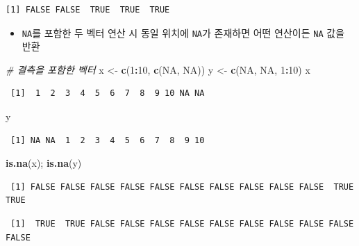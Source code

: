 \documentclass[
  11pt,
]{krantz}
\newenvironment{Shaded}{\begin{snugshade}}{\end{snugshade}}
\newcommand{\CommentTok}[1]{\textcolor[rgb]{0.37,0.37,0.37}{\textit{#1}}}
\newcommand{\DecValTok}[1]{\textcolor[rgb]{0.06,0.06,0.06}{#1}}
\newcommand{\KeywordTok}[1]{\textcolor[rgb]{0.27,0.27,0.27}{\textbf{#1}}}
\newcommand{\NormalTok}[1]{#1}
\newcommand{\OperatorTok}[1]{\textcolor[rgb]{0.43,0.43,0.43}{\textbf{#1}}}
\newcommand{\OtherTok}[1]{\textcolor[rgb]{0.37,0.37,0.37}{#1}}
\newcommand{\StringTok}[1]{\textcolor[rgb]{0.5,0.5,0.5}{#1}}
\providecommand{\tightlist}{%
  \setlength{\itemsep}{0pt}\setlength{\parskip}{0pt}}
\begin{document}
\begin{verbatim}
[1] FALSE FALSE  TRUE  TRUE  TRUE
\end{verbatim}

\normalsize

\begin{itemize}
\tightlist
\item
  \texttt{NA}를 포함한 두 벡터 연산 시 동일 위치에 \texttt{NA}가 존재하면 어떤 연산이든 \texttt{NA} 값을 반환
\end{itemize}

\footnotesize

\begin{Shaded}
\begin{Highlighting}[]
\CommentTok{# 결측을 포함한 벡터}
\NormalTok{x <-}\StringTok{ }\KeywordTok{c}\NormalTok{(}\DecValTok{1}\OperatorTok{:}\DecValTok{10}\NormalTok{, }\KeywordTok{c}\NormalTok{(}\OtherTok{NA}\NormalTok{, }\OtherTok{NA}\NormalTok{))}
\NormalTok{y <-}\StringTok{ }\KeywordTok{c}\NormalTok{(}\OtherTok{NA}\NormalTok{, }\OtherTok{NA}\NormalTok{, }\DecValTok{1}\OperatorTok{:}\DecValTok{10}\NormalTok{)}
\NormalTok{x}
\end{Highlighting}
\end{Shaded}

\begin{verbatim}
 [1]  1  2  3  4  5  6  7  8  9 10 NA NA
\end{verbatim}

\begin{Shaded}
\begin{Highlighting}[]
\NormalTok{y}
\end{Highlighting}
\end{Shaded}

\begin{verbatim}
 [1] NA NA  1  2  3  4  5  6  7  8  9 10
\end{verbatim}

\begin{Shaded}
\begin{Highlighting}[]
\KeywordTok{is.na}\NormalTok{(x); }\KeywordTok{is.na}\NormalTok{(y)}
\end{Highlighting}
\end{Shaded}

\begin{verbatim}
 [1] FALSE FALSE FALSE FALSE FALSE FALSE FALSE FALSE FALSE FALSE  TRUE  TRUE
\end{verbatim}

\begin{verbatim}
 [1]  TRUE  TRUE FALSE FALSE FALSE FALSE FALSE FALSE FALSE FALSE FALSE FALSE
\end{verbatim}
\end{document}
